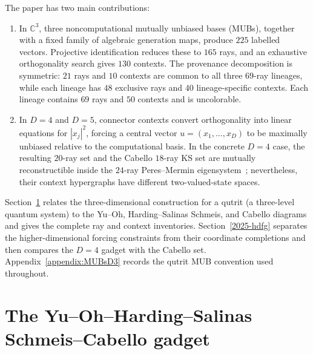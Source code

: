 \documentclass[%
  reprint,
  superscriptaddress,
  showpacs,
  showkeys,
  amsmath,amssymb,
  pra,
  longbibliography,
  floatfix,
  x11names
]{revtex4-2}
\newenvironment{revision}{\begingroup}{\endgroup}
\begin{document}
\begin{revision}
The paper has two main contributions:
\begin{enumerate}
\item In $\mathbb{C}^3$, three noncomputational mutually unbiased bases (MUBs), together with a fixed family of algebraic generation maps, produce $225$ labelled vectors.  Projective identification reduces these to $165$ rays, and an exhaustive orthogonality search gives $130$ contexts.  The provenance decomposition is symmetric: $21$ rays and $10$ contexts are common to all three $69$-ray lineages, while each lineage has $48$ exclusive rays and $40$ lineage-specific contexts.  Each lineage contains $69$ rays and $50$ contexts and is uncolorable.
\item In $D=4$ and $D=5$, connector contexts convert orthogonality into linear equations for $|x_j|^2$, forcing a central vector $u=(x_1,\ldots,x_D)$ to be maximally unbiased relative to the computational basis.  In the concrete $D=4$ case, the resulting $20$-ray set and the Cabello $18$-ray KS set are mutually reconstructible inside the $24$-ray Peres--Mermin eigensystem~\cite{peres111,mermin90b,peres-91,pavicic-2004ksafq,cabello-96}; nevertheless, their context hypergraphs have different two-valued-state spaces.
\end{enumerate}

Section~\ref{2025-yohscg} relates the
three-dimensional construction for a qutrit (a three-level quantum system)
to the Yu--Oh, Harding--Salinas Schmeis, and Cabello diagrams and gives the complete ray and context inventories.  Section~\ref{2025-hdfg} separates the higher-dimensional forcing constraints from their coordinate completions and then compares the $D=4$ gadget with the Cabello set.  Appendix~\ref{appendix:MUBsD3} records the qutrit MUB convention used throughout.
\end{revision}


\section{The Yu--Oh--Harding--Salinas Schmeis--Cabello gadget}
\label{2025-yohscg}
\end{document}
